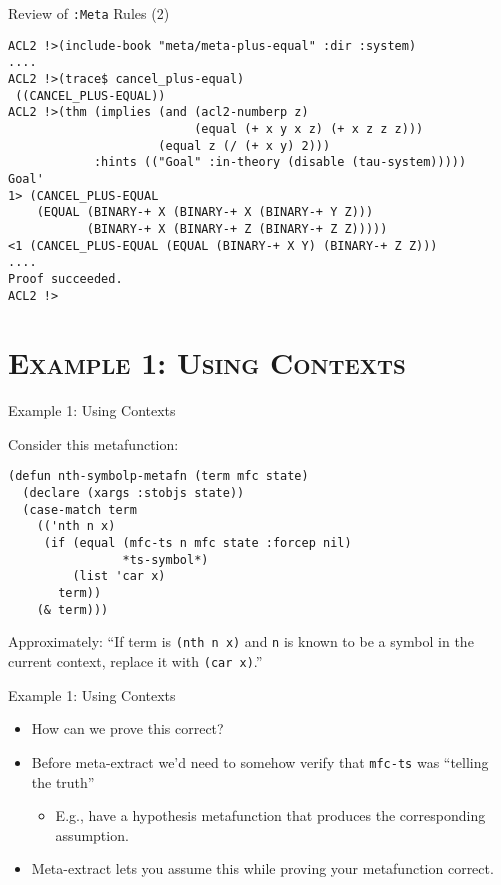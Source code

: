 \begin{frame}[fragile]{Review of {\tt :Meta} Rules (2)}

{\footnotesize
\begin{verbatim}
ACL2 !>(include-book "meta/meta-plus-equal" :dir :system)
....
ACL2 !>(trace$ cancel_plus-equal)
 ((CANCEL_PLUS-EQUAL))
ACL2 !>(thm (implies (and (acl2-numberp z)
                          (equal (+ x y x z) (+ x z z z)))
                     (equal z (/ (+ x y) 2)))
            :hints (("Goal" :in-theory (disable (tau-system)))))
Goal'
1> (CANCEL_PLUS-EQUAL
    (EQUAL (BINARY-+ X (BINARY-+ X (BINARY-+ Y Z)))
           (BINARY-+ X (BINARY-+ Z (BINARY-+ Z Z)))))
<1 (CANCEL_PLUS-EQUAL (EQUAL (BINARY-+ X Y) (BINARY-+ Z Z)))
....
Proof succeeded.
ACL2 !>
\end{verbatim}
}

\end{frame}
\section[\scshape Example 1]{\scshape Example 1: Using Contexts}
\begin{frame}[fragile]{Example 1: Using Contexts}

Consider this metafunction:
\begin{Verbatim}[frame=none, framesep=5pt]
(defun nth-symbolp-metafn (term mfc state)
  (declare (xargs :stobjs state))
  (case-match term
    (('nth n x)
     (if (equal (mfc-ts n mfc state :forcep nil)
                *ts-symbol*)
         (list 'car x)
       term))
    (& term)))
\end{Verbatim}
Approximately: ``If term is \verb|(nth n x)| and \verb|n| is
known to be a symbol in the current context, replace it with
\verb|(car x)|.''

\end{frame}

\begin{frame}[fragile]{Example 1: Using Contexts}
\begin{itemize}
\item How can we prove this correct?
\item Before meta-extract we'd need to somehow verify that \texttt{mfc-ts} was ``telling the truth''
  \begin{itemize}
  \item E.g., have a hypothesis metafunction that produces the corresponding assumption.
  \end{itemize}
\item Meta-extract lets you assume this while proving your metafunction correct.
\end{itemize}
\end{frame}

